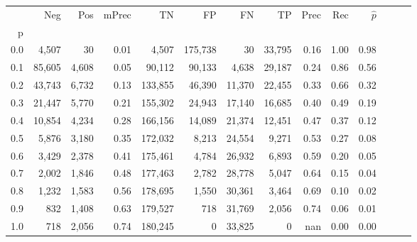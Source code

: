 \begin{tabular}{rrrrrrrrrrrrrr}
\toprule
{} &     Neg &    Pos & mPrec &       TN &       FP &      FN &      TP &  Prec &   Rec & $\hat{p}$ \\
p   &         &        &       &          &          &         &         &       &       &           \\
\midrule
0.0 &   4,507 &     30 &  0.01 &    4,507 &  175,738 &      30 &  33,795 &  0.16 &  1.00 &      0.98 \\
0.1 &  85,605 &  4,608 &  0.05 &   90,112 &   90,133 &   4,638 &  29,187 &  0.24 &  0.86 &      0.56 \\
0.2 &  43,743 &  6,732 &  0.13 &  133,855 &   46,390 &  11,370 &  22,455 &  0.33 &  0.66 &      0.32 \\
0.3 &  21,447 &  5,770 &  0.21 &  155,302 &   24,943 &  17,140 &  16,685 &  0.40 &  0.49 &      0.19 \\
0.4 &  10,854 &  4,234 &  0.28 &  166,156 &   14,089 &  21,374 &  12,451 &  0.47 &  0.37 &      0.12 \\
0.5 &   5,876 &  3,180 &  0.35 &  172,032 &    8,213 &  24,554 &   9,271 &  0.53 &  0.27 &      0.08 \\
0.6 &   3,429 &  2,378 &  0.41 &  175,461 &    4,784 &  26,932 &   6,893 &  0.59 &  0.20 &      0.05 \\
0.7 &   2,002 &  1,846 &  0.48 &  177,463 &    2,782 &  28,778 &   5,047 &  0.64 &  0.15 &      0.04 \\
0.8 &   1,232 &  1,583 &  0.56 &  178,695 &    1,550 &  30,361 &   3,464 &  0.69 &  0.10 &      0.02 \\
0.9 &     832 &  1,408 &  0.63 &  179,527 &      718 &  31,769 &   2,056 &  0.74 &  0.06 &      0.01 \\
1.0 &     718 &  2,056 &  0.74 &  180,245 &        0 &  33,825 &       0 &   nan &  0.00 &      0.00 \\
\bottomrule
\end{tabular}
